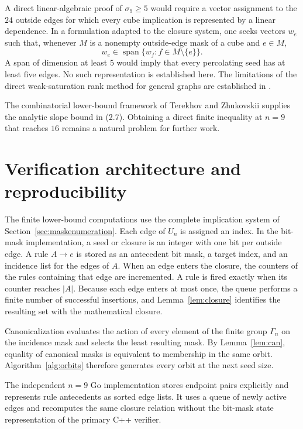 \documentclass[11pt]{article}
\numberwithin{equation}{section}
\begin{document}
A direct linear-algebraic proof of $\sigma_9\ge5$ would require a vector assignment to the $24$ outside edges for which every cube implication is represented by a linear dependence. In a formulation adapted to the closure system, one seeks vectors $w_e$ such that, whenever $M$ is a nonempty outside-edge mask of a cube and $e\in M$,
\[
w_e\in\operatorname{span}\{w_f:f\in M\setminus\{e\}\}.
\]
A span of dimension at least $5$ would imply that every percolating seed has at least five edges. No such representation is established here. The limitations of the direct weak-saturation rank method for general graphs are established in \cite{TZrank2025}.

The combinatorial lower-bound framework of Terekhov and Zhukovskii supplies the analytic slope bound in (2.7). Obtaining a direct finite inequality at $n=9$ that reaches $16$ remains a natural problem for further work.

\section{Verification architecture and reproducibility}\label{sec:repro}
The finite lower-bound computations use the complete implication system of
Section~\ref{sec:maskenumeration}. Each edge of $U_n$ is assigned an index. In
the bit-mask implementation, a seed or closure is an integer with one bit per
outside edge. A rule $A\to e$ is stored as an antecedent bit mask, a target
index, and an incidence list for the edges of $A$. When an edge enters the
closure, the counters of the rules containing that edge are incremented. A
rule is fired exactly when its counter reaches $|A|$. Because each edge enters
at most once, the queue performs a finite number of successful insertions, and
Lemma~\ref{lem:closure} identifies the resulting set with the mathematical
closure.

Canonicalization evaluates the action of every element of the finite group
$\Gamma_n$ on the incidence mask and selects the least resulting mask. By
Lemma~\ref{lem:can}, equality of canonical masks is equivalent to membership
in the same orbit. Algorithm~\ref{alg:orbits} therefore generates every orbit
at the next seed size.

The independent $n=9$ Go implementation stores endpoint pairs explicitly and
represents rule antecedents as sorted edge lists. It uses a queue of newly
active edges and recomputes the same closure relation without the bit-mask
state representation of the primary C++ verifier.
\end{document}
